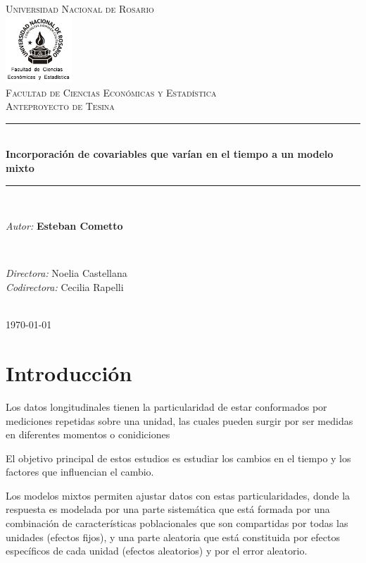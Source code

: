 \documentclass[spanish]{article}
\title{\thesistitle}
\author{\thesisauthorfirst\space\thesisauthorsecond}
\date{\thesisdate}
\numberwithin{figure}{subsection}
\numberwithin{equation}{subsection}
\numberwithin{table}{subsection}
\def\thesistitle{Incorporación de covariables que varían en el tiempo a un modelo mixto}
\def\thesisauthorfirst{\textbf{Esteban Cometto}}
\def\thesissupervisorfirst{Noelia Castellana}
\def\thesissupervisorsecond{Cecilia Rapelli}
\def\thesisdate{\today}
\begin{document}
\begin{titlepage}
    \newcommand{\HRule}{\rule{\linewidth}{0.5mm}}
	\center
	\textsc{\Large Universidad Nacional de Rosario}\\[.7cm]
	\includegraphics[width=25mm]{img/fceye-unr.png}\\[.5cm]
	\textsc{Facultad de Ciencias Económicas y Estadística}\\[0.5cm]
	\textsc{Anteproyecto de Tesina}
	
	\HRule \\[0.4cm]
	{ \huge \bfseries \thesistitle}\\[0.1cm]
	\HRule \\[.5cm]
	
	\begin{minipage}{0.6\textwidth}
	\large
	\textit{Autor:}	\thesisauthorfirst
	\end{minipage}
	\\[.6cm]
	\begin{minipage}{0.6\textwidth}
	\textit{Directora:} 	\thesissupervisorfirst \\[.2cm]
	\textit{Codirectora:} 	\thesissupervisorsecond
	\end{minipage}
	\\[4cm]
	\vfill
	{\large \thesisdate}\\
	\clearpage
\end{titlepage}

\newpage
\tableofcontents

\newpage
\section{Introducción}

Los datos longitudinales tienen la particularidad de estar conformados por
mediciones repetidas sobre una unidad, las cuales pueden surgir por ser medidas
en diferentes momentos o conidiciones

El objetivo principal de estos estudios es estudiar los cambios en el tiempo y
los factores que influencian el cambio. 

Los modelos mixtos permiten ajustar datos con estas particularidades, donde la
respuesta es modelada por una parte sistemática que está formada por una
combinación de características poblacionales que son compartidas por todas las
unidades (efectos fijos), y una parte aleatoria que está constituida por
efectos específicos de cada unidad (efectos aleatorios) y por el error
aleatorio.
\end{document}
